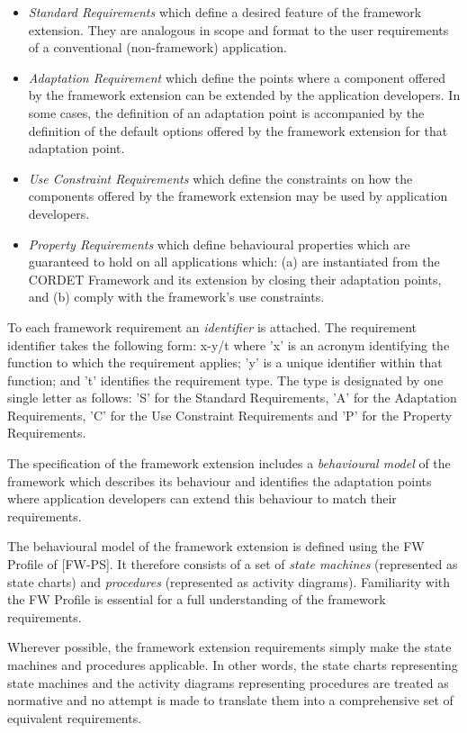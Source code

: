 \documentclass{pnp_article}
\begin{document}
\begin{itemize}
\item{} \textit{Standard Requirements} which define a desired feature of the framework extension. They are analogous in scope and format to the user requirements of a conventional (non-framework) application.
\item{} \textit{Adaptation Requirement} which define the points where a component offered by the framework extension can be extended by the application developers. In some cases, the definition of an adaptation point is accompanied by the definition of the default options offered by the framework extension for that adaptation point.  
\item{} \textit{Use Constraint Requirements} which define the constraints on how the components offered by the framework extension may be used by application developers.
\item{} \textit{Property Requirements} which define behavioural properties which are guaranteed to hold on all applications which: (a) are instantiated from the CORDET Framework and its extension by closing their adaptation points, and (b) comply with the framework's use constraints.
\end{itemize}

To each framework requirement an \textit{identifier} is attached.
The requirement identifier takes the following form: x-y/t where 'x' is an acronym identifying the function to which the requirement applies; 'y' is a unique identifier within that function; and 't' identifies the requirement type. 
The type is designated by one single letter as follows: 'S' for the Standard Requirements, 'A' for the Adaptation Requirements, 'C' for the Use Constraint Requirements and 'P' for the Property Requirements.

The specification of the framework extension includes a \textit{behavioural model} of the framework which describes its behaviour and identifies the adaptation points where application developers can extend this behaviour to match their requirements.  

The behavioural model of the framework extension is defined using the FW Profile of [FW-PS]. It therefore consists of a set of \textit{state machines} (represented as state charts) and \textit{procedures} (represented as  activity diagrams). Familiarity with the FW Profile is essential for a full understanding of the framework requirements.

Wherever possible, the framework extension requirements simply make the state machines and procedures applicable. In other words, the state charts representing state machines and the activity diagrams representing procedures are treated as normative and no attempt is made to translate them into a comprehensive set of equivalent requirements.
\end{document}
